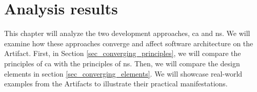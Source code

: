 \chapter{Analysis results} \label{chap_evaluation}

This chapter will analyze the two development approaches, \gls{ca} and \gls{ns}. We will
examine how these approaches converge and affect software architecture on the Artifact.
First, in Section \ref{sec_converging_principles}, we will compare the principles of
\gls{ca} with the principles of \gls{ns}. Then, we will compare the design elements in
section \ref{sec_converging_elements}. We will showcase real-world examples from the
Artifacts to illustrate their practical manifestations.






